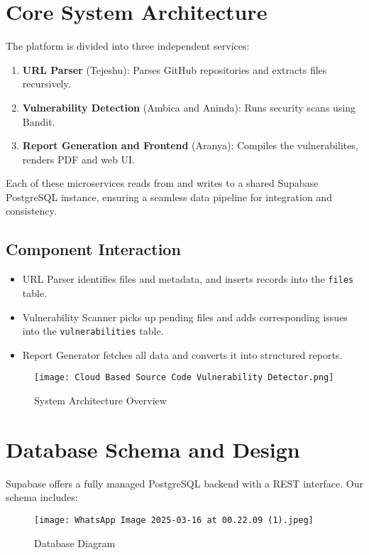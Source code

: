 \documentclass{article}
\begin{document}
\section{Core System Architecture}
The platform is divided into three independent services:
\begin{enumerate}
    \item \textbf{URL Parser} (Tejeshu): Parses GitHub repositories and extracts files recursively.
    \item \textbf{Vulnerability Detection} (Ambica and Aninda): Runs security scans using Bandit.
    \item \textbf{Report Generation and Frontend} (Aranya): Compiles the vulnerabilites, renders PDF and web UI.
\end{enumerate}

Each of these microservices reads from and writes to a shared Supabase PostgreSQL instance, ensuring a seamless data pipeline for integration and consistency.

\subsection{Component Interaction}
\begin{itemize}
    \item URL Parser identifies files and metadata, and inserts records into the \texttt{files} table.
    \item Vulnerability Scanner picks up pending files and adds corresponding issues into the \texttt{vulnerabilities} table.
    \item Report Generator fetches all data and converts it into structured reports.
\end{itemize}

\begin{figure}[h!]
\centering
\texttt{[image: Cloud Based Source Code Vulnerability Detector.png]}
\caption{System Architecture Overview}
\end{figure}

\section{Database Schema and Design}
Supabase offers a fully managed PostgreSQL backend with a REST interface. Our schema includes:

\begin{figure}[h!]
\centering
\texttt{[image: WhatsApp Image 2025-03-16 at 00.22.09 (1).jpeg]}
\caption{Database Diagram}
\end{figure}
\end{document}
